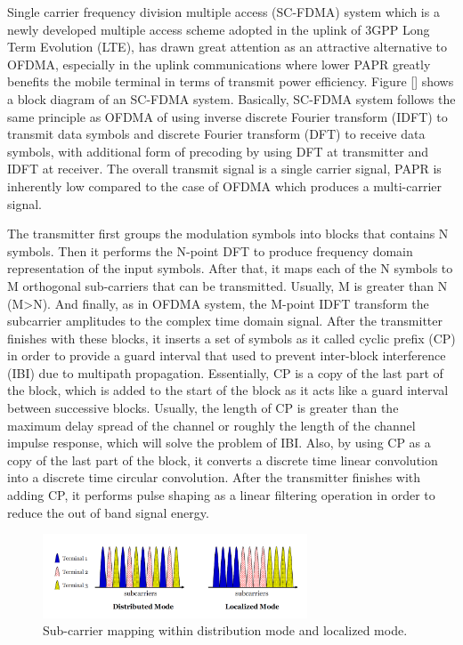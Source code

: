 \documentclass[12pt,a4paper,notitlepage,twoside,headsepline]{scrartcl}
\begin{document}
Single carrier frequency division multiple access (SC-FDMA) system which is a newly developed multiple access scheme adopted in the uplink of 3GPP Long Term Evolution (LTE),  has drawn great attention as an attractive alternative to OFDMA, especially in the uplink communications where lower PAPR greatly benefits the mobile terminal in terms of transmit power efficiency. Figure [] shows a block diagram of an SC-FDMA system. Basically, SC-FDMA system follows the same principle as OFDMA of using inverse discrete Fourier transform (IDFT) to transmit data symbols and discrete Fourier transform (DFT) to receive data symbols, with additional form of precoding by using DFT at transmitter and IDFT at receiver. The overall transmit signal is a single carrier signal, PAPR is inherently low compared to the case of OFDMA which produces a multi-carrier signal. 

The transmitter first groups the modulation symbols into blocks that contains N symbols. Then it performs the N-point DFT to produce frequency domain representation of the input symbols. After that, it maps each of the N symbols to M orthogonal sub-carriers that can be transmitted. Usually, M is greater than N (M>N). And finally, as in OFDMA system, the M-point IDFT transform the subcarrier amplitudes to the complex time domain signal. After the transmitter finishes with these blocks, it inserts a set of symbols as it called cyclic prefix (CP) in order to provide a guard interval that used to prevent inter-block interference (IBI) due to multipath propagation. Essentially, CP is a copy of the last part of the block, which is added to the start of the block as it acts like a guard interval between successive blocks. Usually, the length of CP is greater than the maximum delay spread of the channel or roughly the length of the channel impulse response, which will solve the problem of IBI. Also, by using CP as a copy of the last part of the block, it converts a discrete time linear convolution into a discrete time circular convolution. After the transmitter finishes with adding CP, it performs pulse shaping as a linear filtering operation in order to reduce the out of band signal energy.

\begin{figure}[!ht]
\begin{center}
\includegraphics[width=0.7\textwidth]{figures/fig2}
\end{center}
\caption{Sub-carrier mapping within distribution mode and localized mode.} %
\label{fig:example}
\end{figure}
\end{document}
